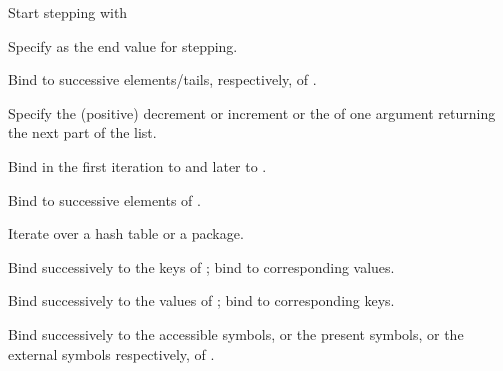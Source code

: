 \begin{LIST}{1cm}
\begin{LIST}{.5cm}
    \begin{LIST}{.5cm}

      {
      Start stepping with 
      }

      {
      Specify  as the end value for stepping.
      }

      {
      Bind  to successive elements/tails, respectively, of .
      }

      {
      Specify the (positive) decrement or increment or the
       of one argument returning the next part of the list.
      }

      {
      Bind  in the first iteration to   and later to .
      }

      {
      Bind  to successive elements of .
      }

      {
      Iterate over a hash table or a package.
      }

      \begin{LIST}{.5cm}

        {
        Bind  successively to the keys of ; bind  to corresponding values.
        }

        {
        Bind  successively to the values of ; bind  to corresponding keys.
        }

        {
        Bind  successively to the accessible symbols, or the present
        symbols, or the external symbols respectively, of
        . 
        }


\end{LIST}
\end{LIST}
\end{LIST}
\end{LIST}
